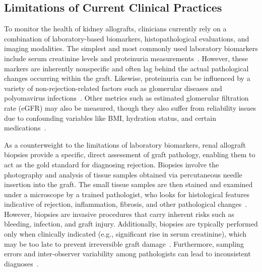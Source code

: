 \subsection{Limitations of Current Clinical Practices}


To monitor the health of kidney allografts, clinicians currently rely on a combination of laboratory-based biomarkers, histopathological evaluations, and imaging modalities. The simplest and most commonly used laboratory biomarkers include serum creatinine levels and proteinuria measurements~\cite{goutaudier_Evaluation_2024,naesens_Proteinuria_2016}. However, these markers are inherently nonspecific and often lag behind the actual pathological changes occurring within the graft. Likewise, proteinuria can be influenced by a variety of non-rejection-related factors such as glomerular diseases and polyomavirus infections~\cite{naesens_Proteinuria_2016}. Other metrics such as estimated glomerular filtration rate (eGFR) may also be measured, though they also suffer from reliability issues due to confounding variables like BMI, hydration status, and certain medications~\cite{loupy_Subclinical_2015,sasaki_Variability_2025}.


As a counterweight to the limitations of laboratory biomarkers, renal allograft biopsies provide a specific, direct assessment of graft pathology, enabling them to act as the gold standard for diagnosing rejection. Biopsies involve the photography and analysis of tissue samples obtained via percutaneous needle insertion into the graft. The small tissue samples are then stained and examined under a microscope by a trained pathologist, who looks for histological features indicative of rejection, inflammation, fibrosis, and other pathological changes~\cite{loupy_Banff_2020}. However, biopsies are invasive procedures that carry inherent risks such as bleeding, infection, and graft injury. Additionally, biopsies are typically performed only when clinically indicated (e.g., significant rise in serum creatinine), which may be too late to prevent irreversible graft damage~\cite{schinstock_Value_2017}. Furthermore, sampling errors and inter-observer variability among pathologists can lead to inconsistent diagnoses~\cite{schinstock_Banff_2019}.

